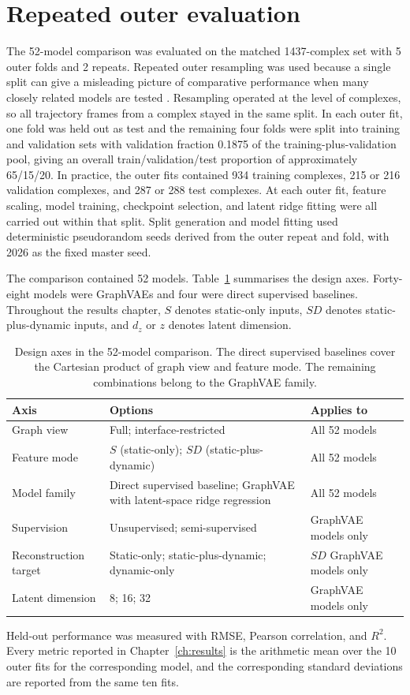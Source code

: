 \section{Repeated outer evaluation}

The 52-model comparison was evaluated on the matched 1437-complex set with 5 outer folds and 2 repeats. Repeated outer resampling was used because a single split can give a misleading picture of comparative performance when many closely related models are tested \citep{Kohavi1995CV}. Resampling operated at the level of complexes, so all trajectory frames from a complex stayed in the same split. In each outer fit, one fold was held out as test and the remaining four folds were split into training and validation sets with validation fraction 0.1875 of the training-plus-validation pool, giving an overall train/validation/test proportion of approximately 65/15/20. In practice, the outer fits contained 934 training complexes, 215 or 216 validation complexes, and 287 or 288 test complexes. At each outer fit, feature scaling, model training, checkpoint selection, and latent ridge fitting were all carried out within that split. Split generation and model fitting used deterministic pseudorandom seeds derived from the outer repeat and fold, with 2026 as the fixed master seed.

The comparison contained 52 models. Table~\ref{tab:model-matrix} summarises the design axes. Forty-eight models were GraphVAEs and four were direct supervised baselines. Throughout the results chapter, $S$ denotes static-only inputs, $SD$ denotes static-plus-dynamic inputs, and $d_z$ or $z$ denotes latent dimension.

\begin{table}[t]
\centering
\small
\begin{tabular}{|p{3.0cm}|p{7.2cm}|p{4.2cm}|}
\hline
Axis & Options & Applies to \\
\hline
Graph view & Full; interface-restricted & All 52 models \\
\hline
Feature mode & $S$ (static-only); $SD$ (static-plus-dynamic) & All 52 models \\
\hline
Model family & Direct supervised baseline; GraphVAE with latent-space ridge regression & All 52 models \\
\hline
Supervision & Unsupervised; semi-supervised & GraphVAE models only \\
\hline
Reconstruction target & Static-only; static-plus-dynamic; dynamic-only & $SD$ GraphVAE models only \\
\hline
Latent dimension & 8; 16; 32 & GraphVAE models only \\
\hline
\end{tabular}
\caption{Design axes in the 52-model comparison. The direct supervised baselines cover the Cartesian product of graph view and feature mode. The remaining combinations belong to the GraphVAE family.}
\label{tab:model-matrix}
\end{table}

Held-out performance was measured with RMSE, Pearson correlation, and $R^2$. Every metric reported in Chapter~\ref{ch:results} is the arithmetic mean over the 10 outer fits for the corresponding model, and the corresponding standard deviations are reported from the same ten fits.
